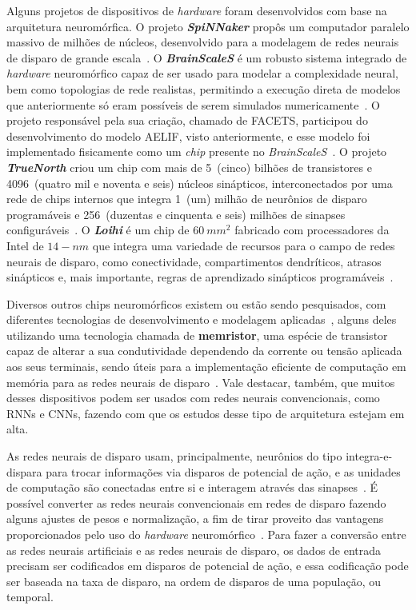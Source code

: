 Alguns projetos de dispositivos de \textit{hardware} foram desenvolvidos com base na arquitetura neuromórfica. O projeto \textbf{\textit{SpiNNaker}} propôs um computador paralelo massivo de milhões de núcleos, desenvolvido para a modelagem de redes neurais de disparo de grande escala~\cite{furber_spinnaker_2014}. O \textbf{\textit{BrainScaleS}} é um robusto sistema integrado de \textit{hardware} neuromórfico capaz de ser usado para modelar a complexidade neural, bem como topologias de rede realistas, permitindo a execução direta de modelos que anteriormente só eram possíveis de serem simulados numericamente~\cite{schemmel_wafer-scale_2010}. O projeto responsável pela sua criação, chamado de FACETS, participou do desenvolvimento do modelo AELIF, visto anteriormente, e esse modelo foi implementado fisicamente como um \textit{chip} presente no \textit{BrainScaleS}~\cite{aamir_lif_2017}. O projeto \textbf{\textit{TrueNorth}} criou um chip com mais de 5~(cinco) bilhões de transistores e 4096~(quatro mil e noventa e seis) núcleos sinápticos, interconectados por uma rede de chips internos que integra 1~(um) milhão de neurônios de disparo programáveis e 256~(duzentas e cinquenta e seis) milhões de sinapses configuráveis~\cite{merolla_million_2014}. O \textbf{\textit{Loihi}} é um chip de $60\ mm^2$ fabricado com processadores da Intel de $14-nm$ que integra uma variedade de recursos para o campo de redes neurais de disparo, como conectividade, compartimentos dendríticos, atrasos sinápticos e, mais importante, regras de aprendizado sinápticos programáveis~\cite{davies_loihi_2018}.

Diversos outros chips neuromórficos existem ou estão sendo pesquisados, com diferentes tecnologias de desenvolvimento e modelagem aplicadas~\cite{mehonic_brain-inspired_2022}, 
alguns deles utilizando uma tecnologia chamada de \textbf{memristor}, uma espécie de transistor capaz de alterar a sua condutividade dependendo da corrente ou tensão aplicada aos seus terminais, sendo úteis para a implementação eficiente de computação em memória para as redes neurais de disparo~\cite{mehonic_memristorsmemory_2020}. Vale destacar, também, que muitos desses dispositivos podem ser usados com redes neurais convencionais, como RNNs e CNNs, fazendo com que os estudos desse tipo de arquitetura estejam em alta.

As redes neurais de disparo usam, principalmente, neurônios do tipo integra-e-dispara para trocar informações via disparos de potencial de ação, e as unidades de computação são conectadas entre si e interagem através das sinapses~\cite{roy_towards_2019}. É possível converter as redes neurais convencionais em redes de disparo fazendo alguns ajustes de pesos e normalização, a fim de tirar proveito das vantagens proporcionados pelo uso do \textit{hardware} neuromórfico~\cite{diehl_conversion_2016}. Para fazer a conversão entre as redes neurais artificiais e as redes neurais de disparo, os dados de entrada precisam ser codificados em disparos de potencial de ação, e essa codificação pode ser baseada na taxa de disparo, na ordem de disparos de uma população, ou temporal.

